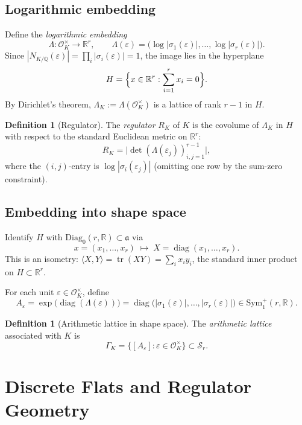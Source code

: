 \documentclass[12pt]{article}
\theoremstyle{definition}
\newtheorem{definition}[theorem]{Definition}
\theoremstyle{remark}
\newcommand{\R}{\mathbb{R}}
\newcommand{\Q}{\mathbb{Q}}
\newcommand{\Symp}{\mathrm{Sym}^{+}}
\newcommand{\Diagz}{\mathrm{Diag}_{0}}
\newcommand{\calM}{\mathcal{S}}
\newcommand{\tr}{\operatorname{tr}}
\newcommand{\diag}{\operatorname{diag}}
\begin{document}
\subsection{Logarithmic embedding}

Define the \emph{logarithmic embedding}
\[
  \Lambda : \mathcal{O}_K^\times \to \R^r, \qquad
  \Lambda(\varepsilon) =
  \bigl(\log|\sigma_1(\varepsilon)|,\ldots,\log|\sigma_r(\varepsilon)|\bigr).
\]
Since $|N_{K/\Q}(\varepsilon)| = \prod_i |\sigma_i(\varepsilon)| = 1$,
the image lies in the hyperplane
\[
  H = \Bigl\{x \in \R^r : \sum_{i=1}^r x_i = 0\Bigr\}.
\]
By Dirichlet's theorem, $\Lambda_K := \Lambda(\mathcal{O}_K^\times)$ is
a lattice of rank $r-1$ in $H$.

\begin{definition}[Regulator]
The \emph{regulator} $R_K$ of $K$ is the covolume of $\Lambda_K$ in
$H$ with respect to the standard Euclidean metric on $\R^r$:
\[
  R_K = \bigl|\det(\Lambda(\varepsilon_j))_{i,j=1}^{r-1}\bigr|,
\]
where the $(i,j)$-entry is $\log|\sigma_i(\varepsilon_j)|$
(omitting one row by the sum-zero constraint).
\end{definition}

\subsection{Embedding into shape space}

Identify $H$ with $\Diagz(r,\R) \subset \mathfrak{a}$ via
\[
  x = (x_1,\ldots,x_r) \;\mapsto\; X = \diag(x_1,\ldots,x_r).
\]
This is an isometry: $\langle X, Y\rangle = \tr(XY) = \sum_i x_i y_i$,
the standard inner product on $H \subset \R^r$.

For each unit $\varepsilon \in \mathcal{O}_K^\times$, define
\[
  A_\varepsilon = \exp\!\bigl(\diag(\Lambda(\varepsilon))\bigr)
  = \diag\!\bigl(|\sigma_1(\varepsilon)|,\ldots,|\sigma_r(\varepsilon)|\bigr)
  \in \Symp_1(r,\R).
\]

\begin{definition}[Arithmetic lattice in shape space]
The \emph{arithmetic lattice} associated with $K$ is
\[
  \Gamma_K = \{[A_\varepsilon] : \varepsilon \in \mathcal{O}_K^\times\}
  \subset \calM_r.
\]
\end{definition}

\section{Discrete Flats and Regulator Geometry}
\label{sec:flats}
\end{document}
